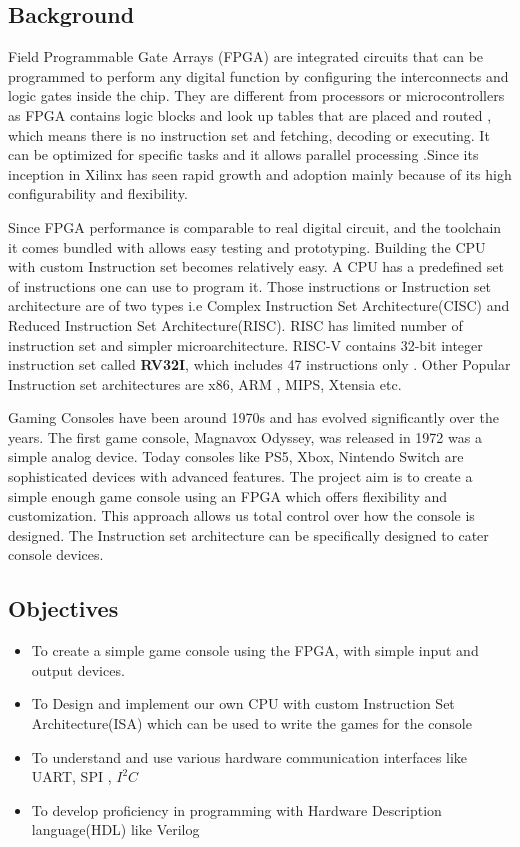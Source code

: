 \documentclass[a4paper,12pt]{article}
\begin{document}
    \subsection{Background}

    \phantom{}

    Field Programmable Gate Arrays (FPGA) are integrated circuits that can be programmed to perform any digital function by configuring the interconnects and logic gates inside the chip. They are different from processors or microcontrollers as FPGA contains logic blocks and look up tables that are placed and routed , which means there is no instruction set and fetching, decoding or executing. It can be optimized for specific tasks and it allows parallel processing .Since its inception in Xilinx has seen rapid growth and adoption mainly because of its high configurability and flexibility. 

    Since FPGA performance is comparable to real digital circuit, and the toolchain it comes bundled with allows easy testing and prototyping. Building the CPU with custom Instruction set becomes relatively easy. A CPU has a predefined set of instructions one can use to program it. Those instructions or Instruction set architecture are of two types i.e  Complex Instruction Set Architecture(CISC) and Reduced Instruction Set Architecture(RISC). RISC has limited number of instruction set and simpler microarchitecture. RISC-V contains 32-bit integer instruction set called \textbf{RV32I}, which includes 47 instructions only . Other Popular Instruction set architectures are x86, ARM , MIPS, Xtensia etc. 

    Gaming Consoles have been around 1970s and has evolved significantly over the years. The first game console, Magnavox Odyssey, was released in 1972 was a simple analog device. Today consoles like PS5, Xbox, Nintendo Switch are sophisticated devices with advanced features. %
    The project aim is to create a simple enough game console using an FPGA which offers flexibility and customization. This approach allows us total control over how the console is designed. The Instruction set architecture can be specifically designed to cater console devices. 

    \subsection{Objectives}
    \begin{itemize}
        \item To create a simple game console using the FPGA, with simple input and output devices.
        \item To Design and implement our own CPU with custom Instruction Set Architecture(ISA) which can be used to write the games for the console
        \item To understand and use various hardware communication interfaces like UART, SPI , $I^2C$
        \item To develop proficiency in programming with Hardware Description language(HDL) like Verilog  
    \end{itemize}
\end{document}
